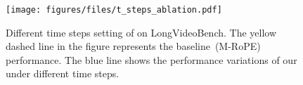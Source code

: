 \begin{figure}[h]
    \centering
    \texttt{[image: figures/files/t\_steps\_ablation.pdf]}
    \caption{Different time steps setting of \methodname on LongVideoBench. The yellow dashed line in the figure represents the baseline~(M-RoPE) performance. The blue line shows the performance variations of our \methodname under different time steps.}
    \label{fig:t_steps_ablation}
\end{figure}